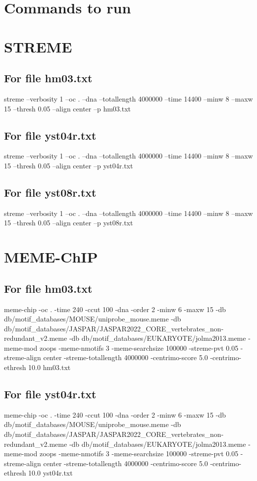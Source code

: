\documentclass{report}
\begin{document}
\clearpage
\section{Commands to run}

\section{STREME}
\subsection{For file hm03.txt}
streme --verbosity 1 --oc . --dna --totallength 4000000 --time 14400 --minw 8 --maxw 15 --thresh 0.05 --align center --p hm03.txt
\subsection{For file yst04r.txt}
streme --verbosity 1 --oc . --dna --totallength 4000000 --time 14400 --minw 8 --maxw 15 --thresh 0.05 --align center --p yst04r.txt
\subsection{For file yst08r.txt}
streme --verbosity 1 --oc . --dna --totallength 4000000 --time 14400 --minw 8 --maxw 15 --thresh 0.05 --align center --p yst08r.txt


\section{MEME-ChIP}
\subsection{For file hm03.txt}
meme-chip -oc . -time 240 -ccut 100 -dna -order 2 -minw 6 -maxw 15 -db db/motif_databases/MOUSE/uniprobe_mouse.meme -db db/motif_databases/JASPAR/JASPAR2022_CORE_vertebrates_non-redundant_v2.meme -db db/motif_databases/EUKARYOTE/jolma2013.meme -meme-mod zoops -meme-nmotifs 3 -meme-searchsize 100000 -streme-pvt 0.05 -streme-align center -streme-totallength 4000000 -centrimo-score 5.0 -centrimo-ethresh 10.0 hm03.txt
\subsection{For file yst04r.txt}
meme-chip -oc . -time 240 -ccut 100 -dna -order 2 -minw 6 -maxw 15 -db db/motif_databases/MOUSE/uniprobe_mouse.meme -db db/motif_databases/JASPAR/JASPAR2022_CORE_vertebrates_non-redundant_v2.meme -db db/motif_databases/EUKARYOTE/jolma2013.meme -meme-mod zoops -meme-nmotifs 3 -meme-searchsize 100000 -streme-pvt 0.05 -streme-align center -streme-totallength 4000000 -centrimo-score 5.0 -centrimo-ethresh 10.0 yst04r.txt
\end{document}
